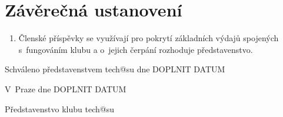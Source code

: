 \documentclass[10pt]{article}
\def \Datum {DOPLNIT DATUM} %
\begin{document}
\section{Závěrečná ustanovení}
	\begin{enumerate}
		\item Členské příspěvky se využívají pro pokrytí základních výdajů spojených s~fungováním klubu a o~jejich čerpání rozhoduje představenstvo.
	\end{enumerate}

	

\vspace{10mm}
Schváleno představenstvem tech@su dne \Datum

\vspace{10mm}

\hfill V~Praze dne \Datum

\hfill Představenstvo klubu tech@su
\end{document}
